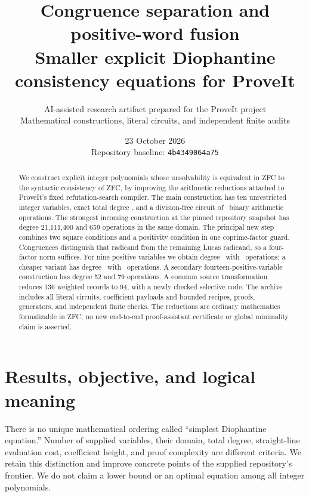 \documentclass[11pt,a4paper]{article}
\title{\textbf{Congruence separation and positive-word fusion}\\[3pt]
\large Smaller explicit Diophantine consistency equations for ProveIt}
\author{AI-assisted research artifact prepared for the ProveIt project\\
\small Mathematical constructions, literal circuits, and independent finite audits}
\date{23 October 2026\\\small Repository baseline: \texttt{4b4349064a75}}
\theoremstyle{definition}\newtheorem{definition}[theorem]{Definition}
\theoremstyle{remark}\newtheorem{remark}[theorem]{Remark}
\begin{document}
\maketitle
\begin{abstract}
We construct explicit integer polynomials whose unsolvability is equivalent
in ZFC to the syntactic consistency of ZFC, by improving the arithmetic
reductions attached to ProveIt's fixed refutation-search compiler. The main
construction has ten unrestricted integer variables, exact total degree
\TenDegree, and a division-free circuit of \TenOps\ binary arithmetic
operations. The strongest incoming construction at the pinned repository
snapshot has degree 21,111,400 and 659 operations in the same domain.
The principal new step combines two square conditions and a positivity
condition in one coprime-factor guard. Congruences distinguish that radicand
from the remaining Lucas radicand, so a four-factor norm suffices.
For nine positive variables we obtain degree \NineDegree\ with \NineOps\
operations; a cheaper variant has degree \FastDegree\ with \FastOps\
operations. A secondary fourteen-positive-variable construction has degree
52 and 79 operations. A common source transformation reduces 136 weighted
records to 94, with a newly checked selective code. The archive includes
all literal circuits, coefficient payloads and bounded recipes, proofs,
generators, and independent finite checks. The reductions are ordinary
mathematics formalizable in ZFC; no new end-to-end proof-assistant certificate
or global minimality claim is asserted.
\end{abstract}
\tableofcontents
\newpage

\section{Results, objective, and logical meaning}

There is no unique mathematical ordering called ``simplest Diophantine
equation.'' Number of supplied variables, their domain, total degree,
straight-line evaluation cost, coefficient height, and proof complexity are
different criteria. We retain this distinction and improve concrete points
of the supplied repository's frontier. We do not claim a lower bound or an
optimal equation among all integer polynomials.
\end{document}
